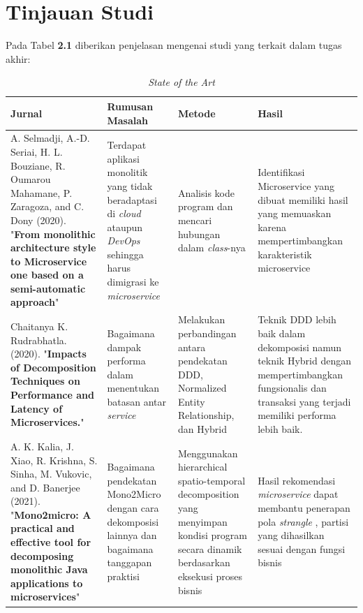 \section{Tinjauan Studi}
\par Pada Tabel \textbf{2.1} diberikan penjelasan mengenai studi yang terkait dalam tugas akhir:

\begingroup
\setlength{\LTleft}{-20cm plus -1fill}
\setlength{\LTright}{\LTleft}
\begin{small}
	\begin{longtable}{|p{3cm}|p{3.5cm}|p{3cm}|p{3.5cm}|}
		\caption{\textit{State of the Art}}\\
		\hline
		\textbf{Jurnal} & \textbf{Rumusan Masalah} & \textbf{Metode} & \textbf{Hasil}\\
		\endfirsthead

		\hline
		A. Selmadji, A.-D. Seriai, H. L. Bouziane, R. Oumarou Mahamane, P. Zaragoza, and C. Dony   (2020). "\textbf{From monolithic architecture style to Microservice one based on a semi-automatic approach}" \cite{5B1} &
		Terdapat aplikasi monolitik yang tidak beradaptasi di \textit{cloud} ataupun \textit{DevOps} sehingga harus dimigrasi ke \textit{microservice} &
		Analisis kode program dan mencari hubungan dalam \textit{class}-nya  &
		Identifikasi Microservice yang dibuat memiliki hasil yang memuaskan karena mempertimbangkan karakteristik microservice
		\\

		\hline
		Chaitanya K. Rudrabhatla. (2020). "\textbf{Impacts of Decomposition Techniques on Performance and Latency of Microservices.}"  \cite{6C1} &
		Bagaimana dampak performa dalam menentukan batasan antar \textit{service}  &
		Melakukan perbandingan antara pendekatan DDD, Normalized Entity Relationship, dan Hybrid &
		Teknik DDD lebih baik dalam dekomposisi namun teknik Hybrid dengan mempertimbangkan fungsionalis dan transaksi yang terjadi memiliki performa lebih baik.
		\\

		\hline
		A. K. Kalia, J. Xiao, R. Krishna, S. Sinha, M. Vukovic, and D. Banerjee (2021). "\textbf{Mono2micro: A practical and effective tool for decomposing monolithic Java applications to microservices}" \cite{8EA} &
		Bagaimana pendekatan Mono2Micro dengan cara dekomposisi lainnya dan bagaimana tanggapan praktisi&
		Menggunakan hierarchical spatio-temporal decomposition  yang menyimpan kondisi program secara dinamik berdasarkan eksekusi proses bisnis  &
		Hasil rekomendasi \textit{microservice} dapat membantu penerapan pola \textit{strangle} , partisi yang dihasilkan sesuai dengan fungsi bisnis
		\\
		

\end{longtable}
\end{small}
